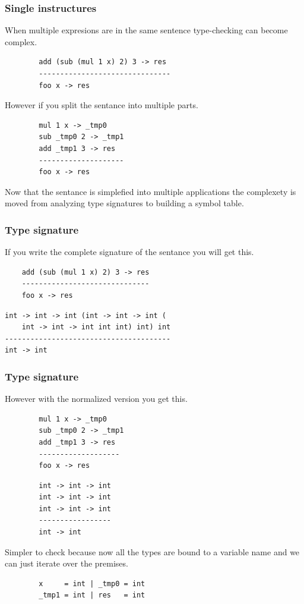 \begin{frame}[fragile]
    \frametitle{Single instructures}
    When multiple expresions are in the same sentence type-checking can become complex.
    \begin{lstlisting}
        add (sub (mul 1 x) 2) 3 -> res
        -------------------------------
        foo x -> res
    \end{lstlisting}
    However if you split the sentance into multiple parts.
    \begin{lstlisting}
        mul 1 x -> _tmp0
        sub _tmp0 2 -> _tmp1
        add _tmp1 3 -> res
        --------------------
        foo x -> res
    \end{lstlisting}
    Now that the sentance is simplefied into multiple applications the complexety is moved from analyzing type signatures to building a symbol table.
\end{frame}

\begin{frame}[fragile]
    \frametitle{Type signature}
    If you write the complete signature of the sentance you will get this.
    \begin{lstlisting}
    add (sub (mul 1 x) 2) 3 -> res
    ------------------------------
    foo x -> res
    \end{lstlisting}
    \begin{lstlisting}
int -> int -> int (int -> int -> int (
    int -> int -> int int int) int) int
---------------------------------------
int -> int
    \end{lstlisting}
\end{frame}

\begin{frame}[fragile]
    \frametitle{Type signature}
    However with the normalized version you get this.
    \begin{lstlisting}
        mul 1 x -> _tmp0
        sub _tmp0 2 -> _tmp1
        add _tmp1 3 -> res
        -------------------
        foo x -> res
    \end{lstlisting}
    \begin{lstlisting}
        int -> int -> int
        int -> int -> int
        int -> int -> int
        -----------------
        int -> int
    \end{lstlisting}
    Simpler to check because now all the types are bound to a variable name and we can just iterate over the premises.
    \begin{lstlisting}
        x     = int | _tmp0 = int
        _tmp1 = int | res   = int
    \end{lstlisting}
\end{frame}
